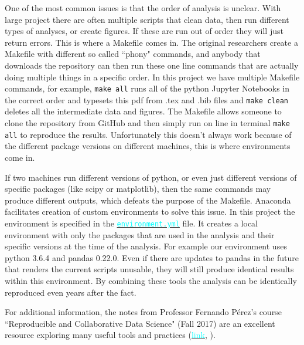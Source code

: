 \documentclass[12pt]{article}
\newcommand{\inlinecode}{\texttt}
\begin{document}
One of the most common issues is that the order of analysis is unclear. With large project there are often multiple scripts that clean data, then run different types of analyses, or create figures. If these are run out of order they will just return errors. This is where a Makefile comes in. The original researchers create a Makefile with different so called ``phony" commands, and anybody that downloads the repository can then run these one line commands that are actually doing multiple things in a specific order. In this project we have multiple Makefile commands, for example, \inlinecode{make all} runs all of the python Jupyter Notebooks in the correct order and typesets this pdf from .tex and .bib files and \inlinecode{make clean} deletes all the intermediate data and figures. The Makefile allows someone to clone the repository from GitHub and then simply run on line in terminal \inlinecode{make all} to reproduce the results. Unfortunately this doesn't always work because of the different package versions on different machines, this is where environments come in.

If two machines run different versions of python, or even just different versions of specific packages (like scipy or matplotlib), then the same commands may produce different outputs, which defeats the purpose of the Makefile. Anaconda facilitates creation of custom environments to solve this issue. In this project the environment is specified in the \href{https://github.com/nadavtadelis/Reproducible_Metrics/blob/master/environment.yml}{\textcolor{cyan}{\inlinecode{environment.yml}}} file. It creates a local environment with only the packages that are used in the analysis and their specific versions at the time of the analysis. For example our environment uses python 3.6.4 and pandas 0.22.0. Even if there are updates to pandas in the future that renders the current scripts unusable, they will still produce identical results within this environment. By combining these tools the analysis can be identically reproduced even years after the fact.

For additional information, the notes from Professor Fernando P\'erez's course ``Reproducible and Collaborative Data Science" (Fall 2017) are an excellent resource exploring many useful tools and practices (\href{https://berkeley-stat159-f17.github.io/stat159-f17/}{\textcolor{cyan}{link}}, \cite{stat159}).

\end{document}
